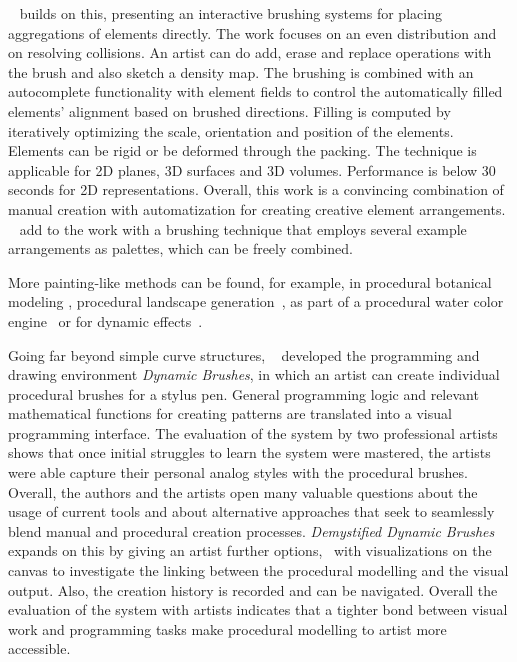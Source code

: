  \citeauthor*{hsu_2020_aef}~\cite{hsu_2020_aef} builds on this, presenting an interactive brushing systems for placing aggregations of elements directly. The work focuses on an even distribution and on resolving collisions. An artist can do add, erase and replace operations with the brush and also sketch a density map. The brushing is combined with an autocomplete functionality with element fields to control the automatically filled elements' alignment based on brushed directions. Filling is computed by iteratively optimizing the scale, orientation and position of the elements. Elements can be rigid or be deformed through the packing. The technique is applicable for 2D planes, 3D surfaces and 3D volumes. Performance is below 30 seconds for 2D representations. Overall, this work is a convincing combination of manual creation with automatization for creating creative element arrangements. \citeauthor*{davison_2019_ief}~\cite{davison_2019_ief} add to the work with a brushing technique that employs several example arrangements as palettes, which can be freely combined. 

More painting-like methods can be found, for example, in procedural botanical modeling \cite{anastacio_2008_spl,chen_2008_stm,palubicki_2009_sot}, procedural landscape generation~\cite{emilien_2015_wie}, as part of a procedural water color engine~\cite{diverdi_2013_ppp} or for dynamic effects~\cite{xing_2016_eit}. 

Going far beyond simple curve structures, \citeauthor*{jacobs_2018_dbe}~\cite{jacobs_2018_dbe} developed the programming and drawing environment \textit{Dynamic Brushes}, in which an artist can create individual procedural brushes for a stylus pen. General programming logic and relevant mathematical functions for creating patterns are translated into a visual programming interface. The evaluation of the system by two professional artists shows that once initial struggles to learn the system were mastered, the artists were able capture their personal analog styles with the procedural brushes. Overall, the authors and the artists open many valuable questions about the usage of current tools and about alternative approaches that seek to seamlessly blend manual and procedural creation processes. \textit{Demystified Dynamic Brushes}~\cite{li_2020_sva} expands on this by giving an artist further options, \eg~with visualizations on the canvas to investigate the linking between the procedural modelling and the visual output. Also, the creation history is recorded and can be navigated. Overall the evaluation of the system with artists indicates that a tighter bond between visual work and programming tasks make procedural modelling to artist more accessible.

